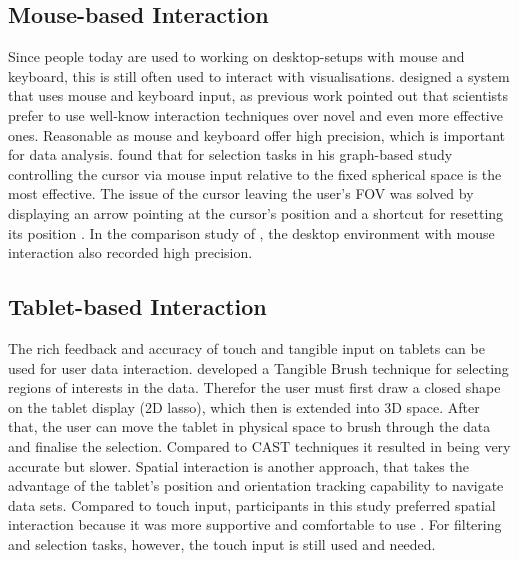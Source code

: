 \subsection{Mouse-based Interaction}
\label{subsection:Desktop-based Interaction}
Since people today are used to working on desktop-setups with mouse and keyboard, this is still often used to interact with visualisations. 
 \cite{Wang2020} designed a system that uses mouse and keyboard input, as previous work pointed out that scientists prefer to use well-know interaction techniques over novel and even more effective ones. Reasonable as mouse and keyboard offer high precision, which is important for data analysis. 
 \newline \cite{Kwon2016} found that for selection tasks in his graph-based study controlling the cursor via mouse input relative to the fixed spherical space is the most effective. The issue of the cursor leaving the user's \ac{FOV} was solved by displaying an arrow pointing at the cursor's position and a shortcut for resetting its position \autocite[]{Kwon2016}.
In the comparison study of \cite{Bach2018}, the desktop environment with mouse interaction also recorded high precision.

\subsection{Tablet-based Interaction}
\label{subsection:Tablet-based Interaction}
The rich feedback and accuracy of touch and tangible input on tablets can be used for user data interaction. \cite{Besancon2019} developed a Tangible Brush technique for selecting regions of interests in the data. Therefor the user must first draw a closed shape on the tablet display (2D lasso), which then is extended into 3D space. After that, the user can move the tablet in physical space to brush through the data and finalise the selection. Compared to CAST techniques \autocite{Yu2016} it resulted in being very accurate but slower.\newline
Spatial interaction is another approach, that takes the advantage of the tablet's position and orientation tracking capability to navigate data sets. Compared to touch input, participants in this study preferred spatial interaction because it was more supportive and comfortable to use \autocite{Buschel2017}. For filtering and selection tasks, however, the touch input is still used and needed.

